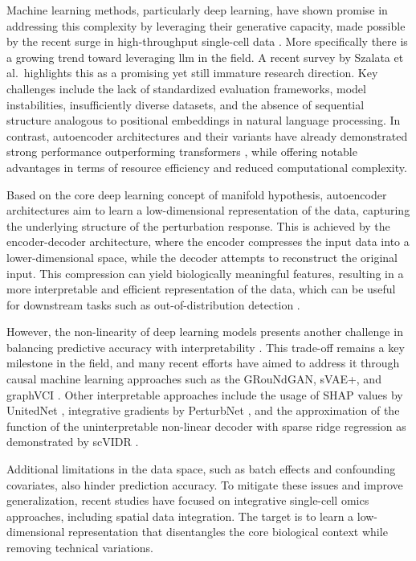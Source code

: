 \documentclass[12pt, a4paper]{article}
\begin{document}
Machine learning methods, particularly deep learning, have shown promise in addressing this complexity by leveraging their generative capacity, made possible by the recent surge in high-throughput single-cell data \cite{gavriilidisMinireviewPerturbationModelling2024}.
More specifically there is a growing trend toward leveraging \gls{llm} in the field. A recent survey by Szalata et al. \cite{szalata2024transformers} highlights this as a promising yet still immature research direction. Key challenges include the lack of standardized evaluation frameworks, model instabilities, insufficiently diverse datasets, and the absence of sequential structure analogous to positional embeddings in natural language processing.
In contrast, autoencoder architectures and their variants have already demonstrated strong performance outperforming transformers \cite{szalata2024transformers}, while offering notable advantages in terms of resource efficiency and reduced computational complexity.


Based on the core deep learning concept of manifold hypothesis, autoencoder architectures aim to learn a low-dimensional representation of the data, capturing the underlying structure of the perturbation response. This is achieved by the encoder-decoder architecture, where the encoder compresses the input data into a lower-dimensional space, while the decoder attempts to reconstruct the original input. This compression can yield biologically meaningful features, resulting in a more interpretable and efficient representation of the data, which can be useful for downstream tasks such as out-of-distribution detection \cite{gavriilidisMinireviewPerturbationModelling2024}.


However, the non-linearity of deep learning models presents another challenge in balancing predictive accuracy with interpretability \cite{kana2023generative}. This trade-off remains a key milestone in the field, and many recent efforts have aimed to address it through causal machine learning approaches such as the GRouNdGAN, sVAE+, and graphVCI \cite{gavriilidisMinireviewPerturbationModelling2024}. Other interpretable approaches include the usage of SHAP values by UnitedNet \cite{tangExplainableMultitaskLearning2023}, integrative gradients by PerturbNet \cite{yuPerturbNetPredictsSinglecell2022},  and the approximation of the function of the uninterpretable non-linear decoder with sparse ridge regression as demonstrated by scVIDR \cite{kanaGenerativeModelingSinglecell2023}.

Additional limitations in the data space, such as batch effects and confounding covariates, also hinder prediction accuracy. To mitigate these issues and improve generalization, recent studies have focused on integrative single-cell omics approaches, including spatial data integration. The target is to learn a low-dimensional representation that disentangles the core biological context while removing technical variations.
\end{document}
